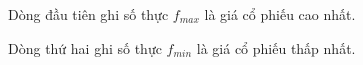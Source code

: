 Dòng đầu tiên ghi số thực $f_{max}$ là giá cổ phiếu cao nhất.

Dòng thứ hai ghi số thực $f_{min}$ là giá cổ phiếu thấp nhất.